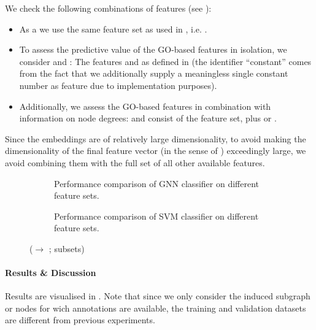 \documentclass[
	fontsize=10pt, %
	twoside=true, %
	secnumdepth=1, %
  toc=indentunnumbered %
]{kaobook}
\begin{document}
We check the following combinations of features (see ):
\begin{itemize}
\item As a  we use the same feature set as used in
  , i.e. .
\item To assess the predictive value of the GO-based features in isolation, we consider
   and : The features
   and  as defined in
   (the identifier ``constant'' comes from the fact
  that we additionally supply a meaningless single constant number as feature
  due to implementation purposes).
\item Additionally, we assess the GO-based features in combination with
  information on node degrees:  and  consist
  of the  feature set, plus  or .
\end{itemize}
Since the embeddings are of relatively large dimensionality, to avoid making the
dimensionality of the final feature vector (in the sense of
) exceedingly large, we avoid combining them with the
full set of all other available features.


\begin{figure}[h]
  \centering
  \begin{subfigure}{0.48\linewidth}
    \caption{Performance comparison of GNN classifier on different feature sets.}
  \end{subfigure}
  \begin{subfigure}{0.48\linewidth}
    \caption{Performance comparison of SVM classifier on different feature sets.}
  \end{subfigure}
  \caption{(\ADLast $\rightarrow$ \PDMap{}; subsets)}
  \label{fig:annotations-results}
\end{figure}

\paragraph{Results \& Discussion} Results are visualised in
. Note that since we only consider the induced
subgraph or nodes for wich annotations are available, the training and
validation datasets are different from previous experiments.
\end{document}
